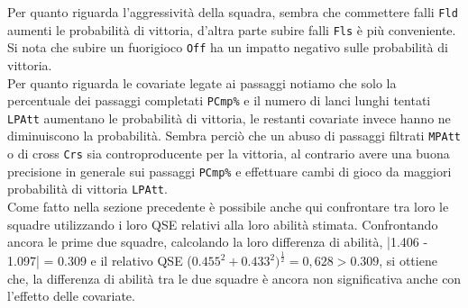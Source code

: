 Per quanto riguarda l'aggressività della squadra, sembra che commettere falli \texttt{Fld} aumenti le probabilità di vittoria, d'altra parte subire falli \texttt{Fls} è più conveniente.\\ 
Si nota che subire un fuorigioco \texttt{Off} ha un impatto negativo sulle probabilità di vittoria.\\
Per quanto riguarda le covariate legate ai passaggi notiamo che solo la percentuale dei passaggi completati \texttt{PCmp\%} e il numero di lanci lunghi tentati \texttt{LPAtt} aumentano le probabilità di vittoria, le restanti covariate invece hanno ne diminuiscono la probabilità. Sembra perciò che un abuso di passaggi filtrati \texttt{MPAtt} o di cross \texttt{Crs} sia controproducente per la vittoria, al contrario avere una buona precisione in generale sui passaggi \texttt{PCmp\%} e effettuare cambi di gioco da maggiori probabilità di vittoria \texttt{LPAtt}. \\

Come fatto nella sezione precedente è possibile anche qui confrontare tra loro le squadre utilizzando i loro QSE relativi alla loro abilità stimata.
Confrontando ancora le prime due squadre, calcolando la loro differenza di abilità, |1.406 - 1.097| = 0.309 e il relativo QSE ($0.455^2 + 0.433^2)^\frac{1}{2}=0,628 > 0.309$, si ottiene che, la differenza di abilità tra le due squadre è ancora non significativa anche con l’effetto delle covariate.

